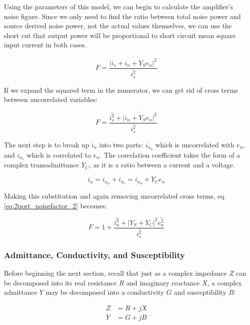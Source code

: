 Using the parameters of this model, we can begin to calculate the amplifier's noise figure. Since we only need to find
the ratio between total noise power and source derived noise power, not the actual values themselves, we can use the
short cut that output power will be proportional to short circuit mean square input current in both cases.

\begin{equation}\label{eq:2port_noisefactor}
    F = \frac{\overline{|i_s + i_n + Y_S e_n|^2}}{\bar{i_s^2}}
\end{equation}

If we expand the squared term in the numerator, we can get rid of cross terms between uncorrelated variables:

\begin{equation}\label{eq:2port_noisefactor_2}
    F = \frac{\bar{i_s^2} + \overline{|i_n + Y_S e_n|^2}}{\bar{i_s^2}}
\end{equation}

The next step is to break up $i_n$ into two parts: $i_{n_u}$ which is uncorrelated with $e_n$, and $i_{n_c}$ which is
correlated to $e_n$. The correlation coefficient takes the form of a complex transadmittance $Y_C$, as it is a ratio between
a current and a voltage.

\begin{equation}\label{eq:cor_uncoor}
    i_n = i_{n_u} + i_{n_c} = i_{n_u} + Y_C e_n
\end{equation}

Making this substitution and again removing uncorrelated cross terms, eq. \ref{eq:2port_noisefactor_2} becomes:

\begin{equation}\label{eq:2port_noisefactor_3}
    F = 1 + \frac{\bar{i_u^2} + |Y_S + Y_C|^2 \bar{e_n^2}}{\bar{i_s^2}}
\end{equation}

\subsubsection{Admittance, Conductivity, and Susceptibility}
Before beginning the next section, recall that just as a complex impedance $Z$ can be decomposed into its real
resistance $R$ and imaginary reactance $X$, a complex admittance $Y$ may be decomposed into a conductivity $G$ and
susceptibility $B$:

\begin{equation}\label{eq:admittance}
    \begin{aligned}
        Z &= R + jX\\
        Y &= G + jB
    \end{aligned}
\end{equation}

